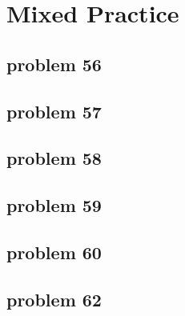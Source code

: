 \section{Mixed Practice}

\subsection{problem 56}


\subsection{problem 57}


\subsection{problem 58}


\subsection{problem 59}


\subsection{problem 60}


\subsection{problem 62}
